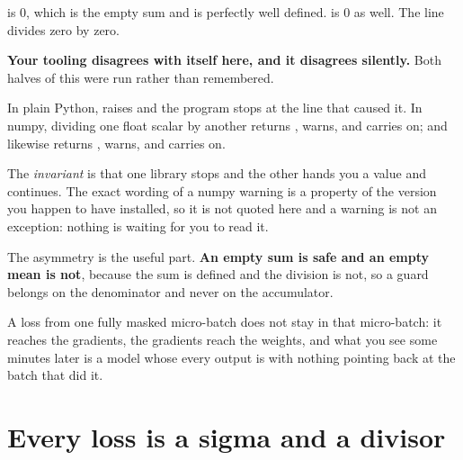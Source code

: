 \begin{fr}
\begin{ansblock}
 is $0$, which is the empty sum and is perfectly well defined.
 is $0$ as well. The line divides zero by zero.
\end{ansblock}

\begin{warning}
\textbf{Your tooling disagrees with itself here, and it disagrees silently.}
Both halves of this were run rather than remembered.

In plain Python,  raises  and the
program stops at the line that caused it. In numpy, dividing one float scalar
by another returns , warns, and carries on; and
 likewise returns , warns, and carries on.

The \emph{invariant} is that one library stops and the other hands you a value
and continues. The exact wording of a numpy warning is a property of the
version you happen to have installed, so it is not quoted here \dash{} and a
warning is not an exception: nothing is waiting for you to read it.
\end{warning}

\begin{aibox}
The asymmetry is the useful part. \textbf{An empty sum is safe and an empty
mean is not}, because the sum is defined and the division is not, so a guard
belongs on the denominator and never on the accumulator.

A  loss from one fully masked micro-batch does not stay in that
micro-batch: it reaches the gradients, the gradients reach the weights, and
what you see some minutes later is a model whose every output is 
with nothing pointing back at the batch that did it.
\end{aibox}
\end{fr}

\section{Every loss is a sigma and a divisor}
\label{sec:F04-loss}

